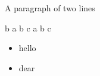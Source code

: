 \documentclass{article}
\begin{document}
A paragraph
of two lines

b
a
b
c
a
b
c




\begin{itemize}  
\item hello
\item dear
\end{itemize}

\end{document}
